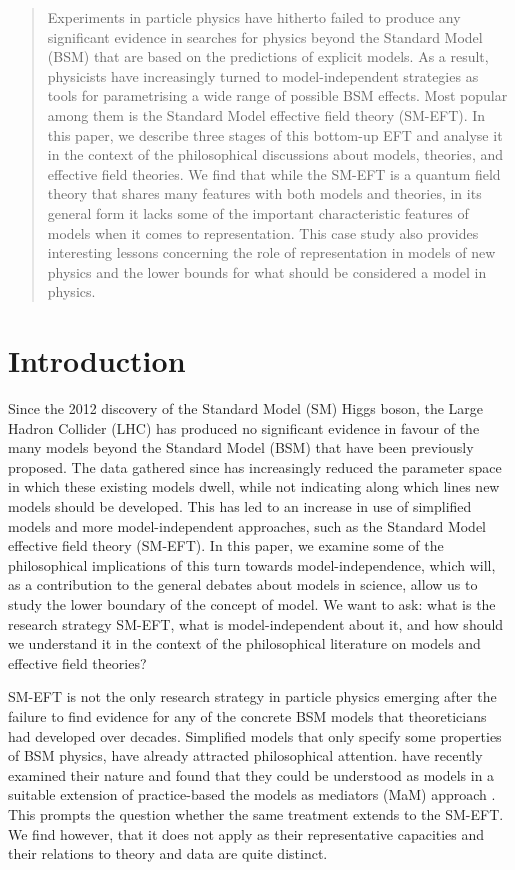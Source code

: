 
\begin{abstract}
Experiments in particle physics have hitherto failed to produce any significant evidence in
searches for physics beyond the Standard Model (BSM) that are based on the predictions of explicit models. 
As a result, physicists have increasingly turned to model-independent strategies as tools for parametrising a wide range of possible BSM effects. Most popular among them is the Standard Model effective field theory (SM-EFT). In this paper, we describe three stages of this bottom-up EFT and analyse it in the context of the philosophical discussions about models, theories, and effective field theories. We find that while the SM-EFT is a quantum field theory that shares many features with both models and theories, in its general form it lacks some of the important characteristic features of models when it comes to representation. This case study also provides interesting lessons concerning the role of representation in models of new physics and the lower bounds for what should be considered a model in physics.
\end{abstract}

\section{Introduction}

Since the 2012 discovery of the Standard Model (SM) Higgs boson, the Large Hadron Collider (LHC) has produced no significant evidence in favour of the many models beyond the Standard Model (BSM) that have been previously proposed. 
The data gathered since has increasingly reduced the parameter space in which these existing models dwell, while not indicating along which lines new models should be developed.
This has led to an increase in use of simplified models and more model-independent approaches, such as the Standard Model effective field theory (SM-EFT). 
In this paper, we examine some of the philosophical implications of this turn towards model-independence, which will, as a contribution to the general debates about models in science, allow us to study the lower boundary of the concept of model. 
We want to ask: what is the research strategy SM-EFT, what is model-independent about it, and how should we understand it in the context of the philosophical literature on models and effective field theories?

SM-EFT is not the only research strategy in particle physics emerging after the failure to find evidence for any of the concrete BSM models that theoreticians had developed over decades. 
Simplified models that only specify some properties of BSM physics, have already attracted philosophical attention. 
\citet{mccoymassimi} have recently examined their nature and found that they could be understood as models in a suitable extension of practice-based the models as mediators (MaM) approach \citep{morganmorrison}.
This prompts the question whether the same treatment extends to the SM-EFT. 
We find however, that it does not apply as their representative capacities and their relations to theory and data are quite distinct. 

